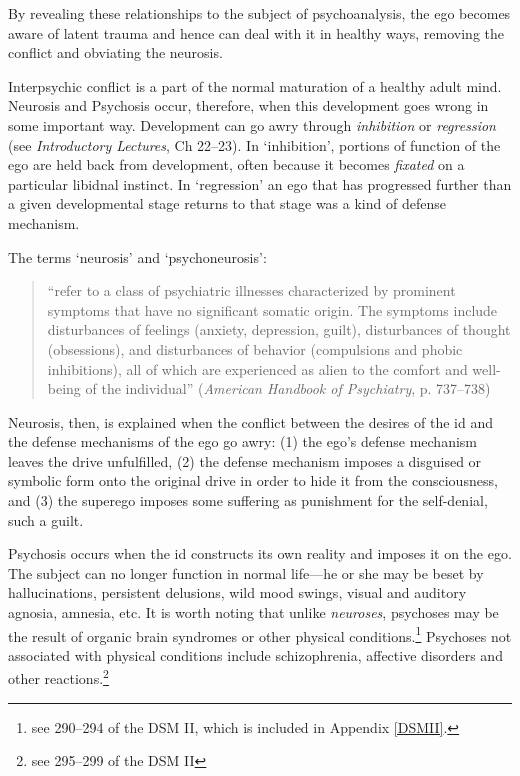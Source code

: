 By revealing these relationships to the subject of psychoanalysis, the ego becomes aware of latent trauma and hence can deal with it in healthy ways, removing the conflict and obviating the neurosis.

Interpsychic conflict is a part of the normal maturation of a healthy adult mind. Neurosis and Psychosis occur, therefore, when this development goes wrong in some important way. Development can go awry through \emph{inhibition} or \emph{regression} (see \emph{Introductory Lectures}, Ch 22--23). In `inhibition', portions of function of the ego are held back from development, often because it becomes \emph{fixated} on a particular libidnal instinct. In `regression' an ego that has progressed further than a given developmental stage returns to that stage was a kind of defense mechanism.

The terms `neurosis' and `psychoneurosis':

\begin{quote}

``refer to a class of psychiatric illnesses characterized by prominent symptoms that have no significant somatic origin. The symptoms include disturbances of feelings (anxiety, depression, guilt), disturbances of thought (obsessions), and disturbances of behavior (compulsions and phobic inhibitions), all of which are experienced as alien to the comfort and well-being of the individual'' (\emph{American Handbook of Psychiatry}, p. 737--738)
\end{quote}

Neurosis, then, is explained when the conflict between the desires of the id and the defense mechanisms of the ego go awry: (1) the ego's defense mechanism leaves the drive unfulfilled, (2) the defense mechanism imposes a disguised or symbolic form onto the original drive in order to hide it from the consciousness, and (3) the superego imposes some suffering as punishment for the self-denial, such a guilt.

Psychosis occurs when the id constructs its own reality and imposes it on the ego. The subject can no longer function in normal life---he or she may be beset by hallucinations, persistent delusions, wild mood swings, visual and auditory agnosia, amnesia, etc. It is worth noting that unlike \emph{neuroses}, psychoses may be the result of organic brain syndromes or other physical conditions.\footnote{see 290--294 of the DSM II, which is included in Appendix \ref{DSMII}.} Psychoses not associated with physical conditions include schizophrenia, affective disorders and other reactions.\footnote{see 295--299 of the DSM II}

